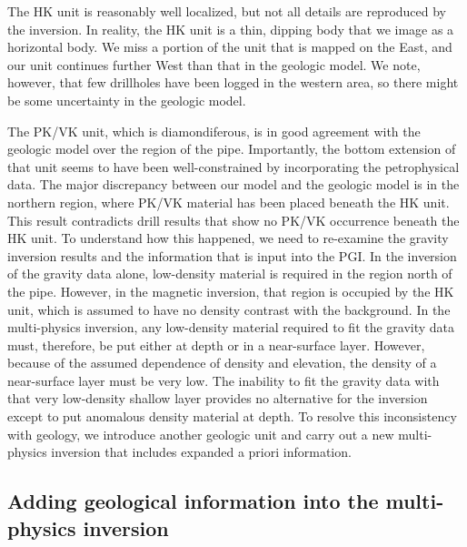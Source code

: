 \documentclass[paper, twocolumn]{geophysics} %
\begin{document}

The HK unit is reasonably well localized, but not all details are reproduced by the inversion. In reality, the HK unit is a thin, dipping body that we image as a horizontal body. We miss a portion of the unit that is mapped on the East, and our unit continues further West than that in the geologic model. We note, however, that few drillholes have been logged in the western area, so there might be some uncertainty in the geologic model.

The PK/VK unit, which is diamondiferous, is in good agreement with the geologic model over the region of the pipe. Importantly, the bottom extension of that unit seems to have been well-constrained by incorporating the petrophysical data. The major discrepancy between our model and the geologic model is in the northern region, where PK/VK material has been placed beneath the HK unit. This result contradicts drill results that show no PK/VK occurrence beneath the HK unit. To understand how this happened, we need to re-examine the gravity inversion results and the information that is input into the PGI.
In the inversion of the gravity data alone, low-density material is required in the region north of the pipe. However, in the magnetic inversion, that region is occupied by the HK unit, which is assumed to have no density contrast with the background. In the multi-physics inversion, any low-density material required to fit the gravity data must, therefore, be put either at depth or in a near-surface layer. However, because of the assumed dependence of density and elevation, the density of a near-surface layer must be very low. The inability to fit the gravity data with that very low-density shallow layer provides no alternative for the inversion except to put anomalous density material at depth. To resolve this inconsistency with geology, we introduce another geologic unit and carry out a new multi-physics inversion that includes expanded a priori information.


\subsection{Adding geological information into the multi-physics inversion}
\end{document}
